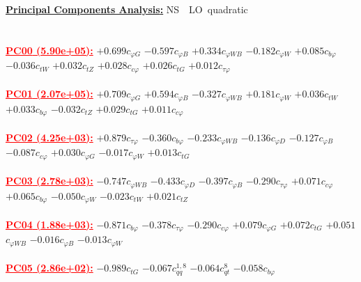 \documentclass{article}
\begin{document}
\noindent \underline{\bf{Principal Components Analysis}:} \rm NS\ \ LO\ quadratic\\ \\ \\
\noindent \textcolor{red}{\underline{\bf{PC00} (5.90e+05):}}
{$+0.699$}{\rm $c_{\varphi G}$}
{$-0.597$}{\rm $c_{\varphi B}$}
{$+0.334$}{\rm $c_{\varphi WB}$}
{$-0.182$}{\rm $c_{\varphi W}$}
{$+0.085$}{\rm $c_{b \varphi}$}
{$-0.036$}{\rm $c_{tW}$}
{$+0.032$}{\rm $c_{tZ}$}
{$+0.028$}{\rm $c_{c \varphi}$}
{$+0.026$}{\rm $c_{tG}$}
{$+0.012$}{\rm $c_{\tau \varphi}$}
 \nonumber \\ \nonumber \\
\noindent \textcolor{red}{\underline{\bf{PC01} (2.07e+05):}}
{$+0.709$}{\rm $c_{\varphi G}$}
{$+0.594$}{\rm $c_{\varphi B}$}
{$-0.327$}{\rm $c_{\varphi WB}$}
{$+0.181$}{\rm $c_{\varphi W}$}
{$+0.036$}{\rm $c_{tW}$}
{$+0.033$}{\rm $c_{b \varphi}$}
{$-0.032$}{\rm $c_{tZ}$}
{$+0.029$}{\rm $c_{tG}$}
{$+0.011$}{\rm $c_{c \varphi}$}
 \nonumber \\ \nonumber \\
\noindent \textcolor{red}{\underline{\bf{PC02} (4.25e+03):}}
{$+0.879$}{\rm $c_{\tau \varphi}$}
{$-0.360$}{\rm $c_{b \varphi}$}
{$-0.233$}{\rm $c_{\varphi WB}$}
{$-0.136$}{\rm $c_{\varphi D}$}
{$-0.127$}{\rm $c_{\varphi B}$}
{$-0.087$}{\rm $c_{c \varphi}$}
{$+0.030$}{\rm $c_{\varphi G}$}
{$-0.017$}{\rm $c_{\varphi W}$}
{$+0.013$}{\rm $c_{tG}$}
 \nonumber \\ \nonumber \\
\noindent \textcolor{red}{\underline{\bf{PC03} (2.78e+03):}}
{$-0.747$}{\rm $c_{\varphi WB}$}
{$-0.433$}{\rm $c_{\varphi D}$}
{$-0.397$}{\rm $c_{\varphi B}$}
{$-0.290$}{\rm $c_{\tau \varphi}$}
{$+0.071$}{\rm $c_{c \varphi}$}
{$+0.065$}{\rm $c_{b \varphi}$}
{$-0.050$}{\rm $c_{\varphi W}$}
{$-0.023$}{\rm $c_{tW}$}
{$+0.021$}{\rm $c_{tZ}$}
 \nonumber \\ \nonumber \\
\noindent \textcolor{red}{\underline{\bf{PC04} (1.88e+03):}}
{$-0.871$}{\rm $c_{b \varphi}$}
{$-0.378$}{\rm $c_{\tau \varphi}$}
{$-0.290$}{\rm $c_{c \varphi}$}
{$+0.079$}{\rm $c_{\varphi G}$}
{$+0.072$}{\rm $c_{tG}$}
{$+0.051$}{\rm $c_{\varphi WB}$}
{$-0.016$}{\rm $c_{\varphi B}$}
{$-0.013$}{\rm $c_{\varphi W}$}
 \nonumber \\ \nonumber \\
\noindent \textcolor{red}{\underline{\bf{PC05} (2.86e+02):}}
{$-0.989$}{\rm $c_{tG}$}
{$-0.067$}{\rm $c_{qq}^{1,8}$}
{$-0.064$}{\rm $c_{qt}^{8}$}
{$-0.058$}{\rm $c_{b \varphi}$}
\end{document}
